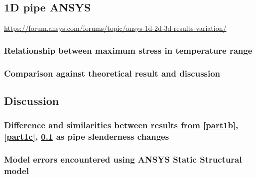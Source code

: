 \subsection{1D pipe ANSYS}\label{part1d}
\url{https://forum.ansys.com/forums/topic/ansys-1d-2d-3d-results-variation/}
\subsubsection{Relationship between maximum stress in temperature range}
\subsubsection{Comparison against theoretical result and discussion}
\subsection{Discussion}
\subsubsection{Difference and similarities between results from \ref{part1b}, \ref{part1c}, \ref{part1d} as pipe slenderness changes}
\subsubsection{Model errors encountered using ANSYS Static Structural model}